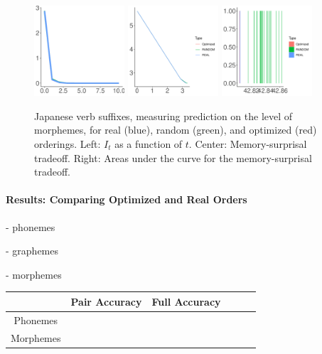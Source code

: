 \begin{figure}
	\begin{center}
\includegraphics[width=0.3\textwidth]{figures/Japanese-suffixes-byMorphemes-it.pdf}
\includegraphics[width=0.3\textwidth]{figures/Japanese-suffixes-byMorphemes-memsurp.pdf}
\includegraphics[width=0.3\textwidth]{figures/Japanese-suffixes-byMorphemes-auc.pdf}
\end{center}
	\caption{Japanese verb suffixes, measuring prediction on the level of morphemes, for real (blue), random (green), and optimized (red) orderings. Left: $I_t$ as a function of $t$. Center: Memory-surprisal tradeoff. Right: Areas under the curve for the memory-surprisal tradeoff.}\label{fig:jap-morph}
\end{figure}


\paragraph{Results: Comparing Optimized and Real Orders}

- phonemes

- graphemes

- morphemes


\begin{tabular}{c|ccccc}
             & Pair Accuracy & Full Accuracy \\ \hline
Phonemes     &   \\
Morphemes     &  \\
\end{tabular}



